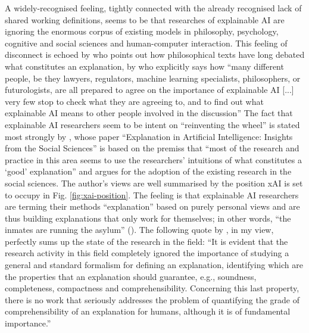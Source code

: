 A widely-recognised feeling, tightly connected with the already recognised lack of shared working definitions, seems to be that researches of explainable AI are ignoring the enormous corpus of existing models in philosophy, psychology, cognitive and social sciences and human-computer interaction.
This feeling of disconnect is echoed by \cite{gilpin2018explaining} who points out how philosophical texts have long debated what constitutes an explanation, by \cite{mittelstadt2019explaining} who explicitly says how \enquote{many different people, be they lawyers, regulators, machine learning specialists, philosophers, or futurologists, are all prepared to agree on the importance of explainable AI [...] very few stop to check what they are agreeing to, and to find out what explainable AI means to other people involved in the discussion}
The fact that explainable AI researchers seem to be intent on \enquote{reinventing the wheel} is stated most strongly by \cite{miller2018explanation}, whose paper \enquote{Explanation in Artificial Intelligence: Insights from the Social Sciences} is based on the premiss that \enquote{most of the research and practice in this area seems to use the researchers' intuitions of what constitutes a `good' explanation} and argues for the adoption of the existing research in the social sciences.
The author's views are well summarised by the position xAI is set to occupy in Fig. \ref{fig:xai-position}.
The feeling is that explainable AI researchers are terming their methods \enquote{explanation} based on purely personal views and are thus building explanations that only work for themselves; in other words, \enquote{the inmates are running the asylum} (\cite{Miller2017}).
The following quote by \cite{guidotti2018survey}, in my view, perfectly sums up the state of the research in the field: \enquote{It is evident that the research activity in this field completely ignored the importance of studying a general and standard formalism for defining an explanation, identifying which are the properties that an explanation should guarantee, e.g., soundness, completeness, compactness and comprehensibility. Concerning this last property, there is no work that seriously addresses the problem of quantifying the grade of comprehensibility of an explanation for humans, although it is of fundamental importance.}

